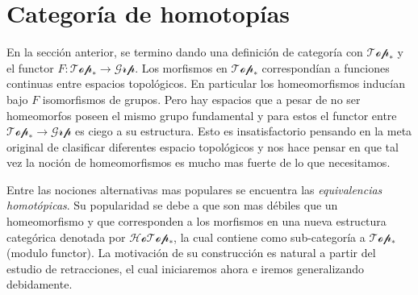 \section{Categoría de homotopías}
En la sección anterior, se termino dando una definición de categoría con
\(\mathscr{Top}_*\) y el functor \(F : \mathscr{Top}_* \to
\mathscr{Grp}\). Los morfismos en \(\mathscr{Top}_*\) correspondían a
funciones continuas entre espacios topológicos. En particular los
homeomorfismos inducían bajo \(F\) isomorfismos de grupos. Pero hay
espacios que a pesar de no ser homeomorfos poseen el mismo grupo
fundamental y para estos el functor entre \(\mathscr{Top}_* \to
\mathscr{Grp}\) es ciego a su estructura. Esto es insatisfactorio
pensando en la meta original de clasificar diferentes espacio
topológicos y nos hace pensar en que tal vez la noción de homeomorfismos
es mucho mas fuerte de lo que necesitamos.

Entre las nociones alternativas mas populares se encuentra las
\emph{equivalencias homotópicas}. Su popularidad se debe a que son mas
débiles que un homeomorfismo y que corresponden a los morfismos en una
nueva estructura categórica denotada por \(\mathscr{HoTop}_*\), la cual
contiene como sub-categoría a \(\mathscr{Top}_*\) (modulo functor). La
motivación de su construcción es natural a partir del estudio de
retracciones, el cual iniciaremos ahora e iremos generalizando
debidamente.

